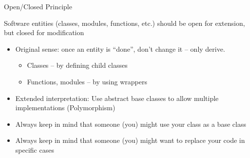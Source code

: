 \begin{frame}{Open/Closed Principle}
%
\begin{defbox}[Definition]
Software entities (classes, modules, functions, etc.) should be open for extension, but closed for modification
\end{defbox}
%
\begin{itemize}
\item Original sense: once an entity is \enquote{done}, don't change it -- only derive.
	\begin{itemize}
	\item Classes -- by defining child classes
	\item Functions, modules -- by using wrappers
	\end{itemize}
\item Extended interpretation: Use abstract base classes to allow multiple implementations (Polymorphism)
\item[\Thus] Always keep in mind that someone (you) might use your class as a base class
\item[\Thus] Always keep in mind that someone (you) might want to replace your code in specific cases
\end{itemize}
%
\end{frame}



